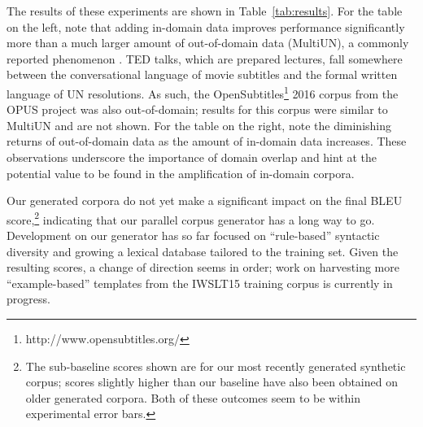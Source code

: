 The results of these experiments are shown in Table~\ref{tab:results}.
For the table on the left, note that adding in-domain data improves performance significantly more than a much larger amount of out-of-domain data (MultiUN), a commonly reported phenomenon .
TED talks, which are prepared lectures, fall somewhere between the conversational language of movie subtitles and the formal written language of UN resolutions.
As such, the OpenSubtitles\footnote{http://www.opensubtitles.org/} 2016 corpus from the OPUS project was also out-of-domain; results for this corpus were similar to MultiUN and are not shown. %
For the table on the right, note the diminishing returns of out-of-domain data as the amount of in-domain data increases.
These observations underscore the importance of domain overlap and hint at the potential value to be found in the amplification of in-domain corpora.

Our generated corpora do not yet make a significant impact on the final BLEU score,\footnote{
    The sub-baseline scores shown are for our most recently generated synthetic corpus; scores slightly higher than our baseline have also been obtained on older generated corpora.
    Both of these outcomes seem to be within experimental error bars.
}
indicating that our parallel corpus generator has a long way to go.
Development on our generator has so far focused on ``rule-based'' syntactic diversity and growing a lexical database tailored to the training set. 
Given the resulting scores, a change of direction seems in order; work on harvesting more ``example-based'' templates from the IWSLT15 training corpus is currently in progress.






